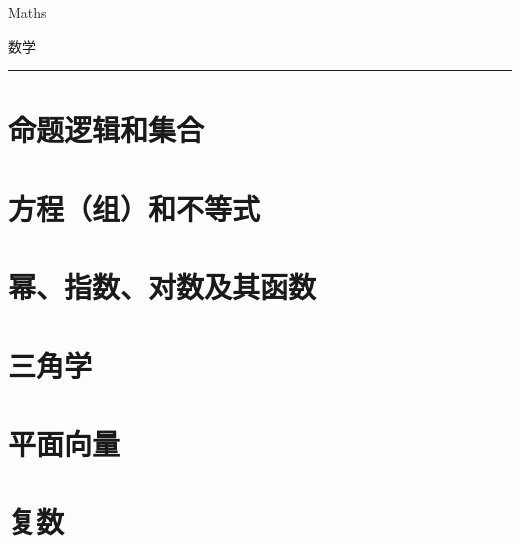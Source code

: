 \documentclass[fontset=none]{ctexbook}
\begin{document}
\sqTurnOffAlerts
{\Huge Maths \par \vspace{1.5em} 数学}

\rule{\textwidth}{1pt}

{\Huge{}}




{\tableofcontents}

\chapter{命题逻辑和集合}



\chapter{方程（组）和不等式}





\chapter{幂、指数、对数及其函数}



\chapter{三角学}
\chapter{平面向量}
\chapter{复数}
\end{document}
